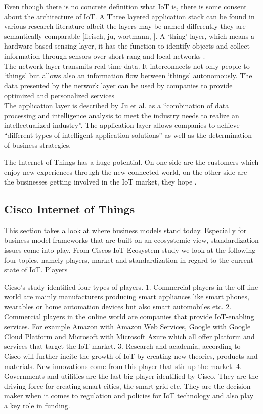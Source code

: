 	Even though there is no concrete definition what IoT is, there is some consent about the architecture of IoT. A Three layered application stack can be found in various research literature albeit the layers may be named differently they are semantically comparable [fleisch, ju, wortmann, ]. A `thing' layer, which means a hardware-based sensing layer, it has the function to identify objects and collect information through sensors over short-rang and local networks \cite{ju}.\\
	The network layer transmits real-time data. It interconnects not only people to `things' but allows also an information flow between `things' autonomously. The data presented by the network layer can be used by companies to provide optimized and personalized services \cite{ju}\\
	The application layer is described by Ju et al. as a ``combination of data processing and intelligence analysis to meet the industry needs to realize an intellectualized industry''. The application layer allows companies to achieve ``different types of intelligent application solutions'' as well as the determination of business strategies\cite{ju}.

	The Internet of Things has a huge potential. On one side are the customers which enjoy new experiences through the new connected world, on the other side are the businesses getting involved in the IoT market, they hope \cite{ju}.

	\subsection{Cisco Internet of Things}
		This section takes a look at where business models stand today. Especially for business model frameworks that are built on an ecosystemic view, standardization issues come into play. From Ciscos IoT Ecosystem study we look at the following four topics, namely players, market and standardization in regard to the current state of IoT.
		Players

		Cicso's study identified four types of players.
		1. Commercial players in the off line world are mainly manufacturers producing smart appliances like smart phones, wearables or home automation devices but also smart automobiles etc.
		2. Commercial players in the online world are companies that provide IoT-enabling services. For example Amazon with Amazon Web Services, Google with Google Cloud Platform and Microsoft with Microsoft Azure which all offer platform and services that target the IoT market.
		3. Research and academia, according to Cisco will further incite the growth of IoT by creating new theories, products and materials. New innovations come from this player that stir up the market.
		4. Governments and utilities are the last big player identified by Cisco. They are the driving force for creating smart cities, the smart grid etc. They are the decision maker when it comes to regulation and policies for IoT technology and also play a key role in funding.
		
